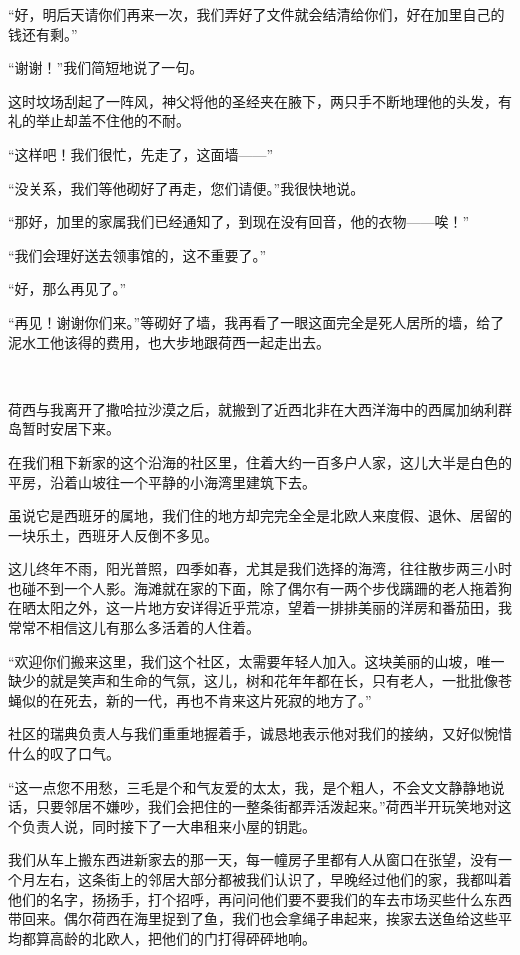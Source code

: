 \par “好，明后天请你们再来一次，我们弄好了文件就会结清给你们，好在加里自己的钱还有剩。”
\par “谢谢！”我们简短地说了一句。
\par 这时坟场刮起了一阵风，神父将他的圣经夹在腋下，两只手不断地理他的头发，有礼的举止却盖不住他的不耐。
\par “这样吧！我们很忙，先走了，这面墙——”
\par “没关系，我们等他砌好了再走，您们请便。”我很快地说。
\par “那好，加里的家属我们已经通知了，到现在没有回音，他的衣物——唉！”
\par “我们会理好送去领事馆的，这不重要了。”
\par “好，那么再见了。”
\par “再见！谢谢你们来。”等砌好了墙，我再看了一眼这面完全是死人居所的墙，给了泥水工他该得的费用，也大步地跟荷西一起走出去。
\par  
\par 荷西与我离开了撒哈拉沙漠之后，就搬到了近西北非在大西洋海中的西属加纳利群岛暂时安居下来。
\par 在我们租下新家的这个沿海的社区里，住着大约一百多户人家，这儿大半是白色的平房，沿着山坡往一个平静的小海湾里建筑下去。
\par 虽说它是西班牙的属地，我们住的地方却完完全全是北欧人来度假、退休、居留的一块乐土，西班牙人反倒不多见。
\par 这儿终年不雨，阳光普照，四季如春，尤其是我们选择的海湾，往往散步两三小时也碰不到一个人影。海滩就在家的下面，除了偶尔有一两个步伐蹒跚的老人拖着狗在晒太阳之外，这一片地方安详得近乎荒凉，望着一排排美丽的洋房和番茄田，我常常不相信这儿有那么多活着的人住着。
\par “欢迎你们搬来这里，我们这个社区，太需要年轻人加入。这块美丽的山坡，唯一缺少的就是笑声和生命的气氛，这儿，树和花年年都在长，只有老人，一批批像苍蝇似的在死去，新的一代，再也不肯来这片死寂的地方了。”
\par 社区的瑞典负责人与我们重重地握着手，诚恳地表示他对我们的接纳，又好似惋惜什么的叹了口气。
\par “这一点您不用愁，三毛是个和气友爱的太太，我，是个粗人，不会文文静静地说话，只要邻居不嫌吵，我们会把住的一整条街都弄活泼起来。”荷西半开玩笑地对这个负责人说，同时接下了一大串租来小屋的钥匙。
\par 我们从车上搬东西进新家去的那一天，每一幢房子里都有人从窗口在张望，没有一个月左右，这条街上的邻居大部分都被我们认识了，早晚经过他们的家，我都叫着他们的名字，扬扬手，打个招呼，再问问他们要不要我们的车去市场买些什么东西带回来。偶尔荷西在海里捉到了鱼，我们也会拿绳子串起来，挨家去送鱼给这些平均都算高龄的北欧人，把他们的门打得砰砰地响。
